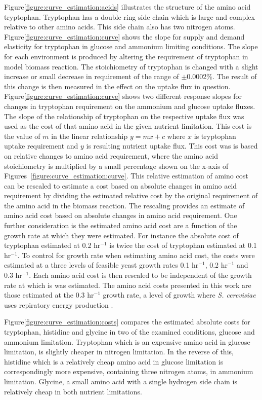 Figure\ref{figure:curve_estimation:acids} illustrates the structure of the amino acid tryptophan. Tryptophan has a double ring side chain which is large and complex relative to other amino acids. This side chain also has two nitrogen atoms. Figure\ref{figure:curve_estimation:curve} shows the slope for supply and demand elasticity for tryptophan in glucose and ammonium limiting conditions. The slope for each environment is produced by altering the requirement of tryptophan in model biomass reaction. The stoichiometry of tryptophan is changed with a slight increase or small decrease in requirement of the range of $\pm$0.0002\%. The result of this change is then measured in the effect on the uptake flux in question. Figure\ref{figure:curve_estimation:curve} shows two different response slopes for changes in tryptophan requirement on the ammonium and glucose uptake fluxes. The slope of the relationship of tryptophan on the respective uptake flux was used as the cost of that amino acid in the given nutrient limitation. This cost is the value of $m$ in the linear relationship $y = mx + c$ where $x$ is tryptophan uptake requirement and $y$ is resulting nutrient uptake flux. This cost was is based on relative changes to amino acid requirement, where the  amino acid stoichiometry is multiplied by a small percentage shown on the x-axis of Figures~\vref{figure:curve_estimation:curve}. This relative estimation of amino cost can be rescaled to estimate a cost based on absolute changes in amino acid requirement by dividing the estimated relative cost by the original requirement of the amino acid in the biomass reaction. The rescaling provides an estimate of amino acid cost based on absolute changes in amino acid requirement. One further consideration is the estimated amino acid cost are a function of the growth rate at which they were estimated. For instance the absolute cost of tryptophan estimated at 0.2 hr$^{-1}$ is twice the cost of tryptophan estimated at 0.1 hr$^{-1}$. To control for growth rate when estimating amino acid cost, the costs were estimated at a three levels of feasible yeast growth rates 0.1 hr$^{-1}$, 0.2 hr$^{-1}$ and 0.3 hr$^{-1}$. Each amino acid cost is then rescaled to be independent of the growth rate at which is was estimated. The amino acid costs presented in this work are those estimated at the 0.3 hr$^{-1}$ growth rate, a level of growth where \emph{S. cerevisiae} uses repiratory energy production \cite{famili2003}.

Figure\ref{figure:curve_estimation:costs} compares the estimated absolute costs for tryptophan, histidine and glycine in two of the examined conditions, glucose and ammonium limitation. Tryptophan which is an expensive amino acid in glucose limitation, is slightly cheaper in nitrogen limitation. In the reverse of this, histidine which is a relatively cheap amino acid in glucose limitation is correspondingly more expensive, containing three nitrogen atoms, in ammonium limitation. Glycine, a small amino acid with a single hydrogen side chain is relatively cheap in both nutrient limitations.


